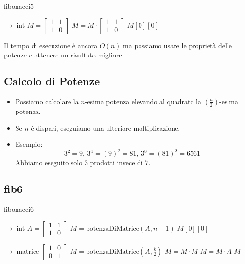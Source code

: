 \documentclass{article}
\begin{document}
\begin{algorithm}
\caption{fibonacci5}
\begin{algorithmic}[1]
 $\rightarrow$ int
  \State $M = \begin{bmatrix} 1 & 1 \\ 1 & 0 \end{bmatrix}$
    \State $M = M \cdot \begin{bmatrix} 1 & 1 \\ 1 & 0 \end{bmatrix}$
  \EndFor
  \State \Return $M[0][0]$
\EndFunction
\end{algorithmic}
Il tempo di esecuzione è ancora $O(n)$ ma possiamo usare le proprietà delle potenze e ottenere un risultato migliore.
\end{algorithm}


\subsection{Calcolo di Potenze}
\begin{itemize}
\item Possiamo calcolare la $n$-esima potenza elevando al quadrato la $\left(\frac{n}{2}\right)$-esima potenza.
\item Se $n$ è dispari, eseguiamo una ulteriore moltiplicazione.

\item Esempio:
  \[3^2 = 9,\ 3^4 = (9)^2 = 81,\ 3^8 = (81)^2 = 6561\]
  Abbiamo eseguito solo $3$ prodotti invece di $7$.
\end{itemize}

\subsection{fib6}
\begin{algorithm}
\caption{fibonacci6}
\begin{algorithmic}[1]
 $\rightarrow$ int
  \State $A = \begin{bmatrix} 1 & 1 \\ 1 & 0 \end{bmatrix}$
  \State $M = \text{potenzaDiMatrice}(A, n-1)$
  \State \Return $M[0][0]$
\EndFunction

 $\rightarrow$ matrice
    \State \Return $\begin{bmatrix} 1 & 0 \\ 0 & 1 \end{bmatrix}$
  \Else
    \State $M = \text{potenzaDiMatrice}(A, \frac{k}{2})$
    \State $M = M \cdot M$
  \EndIf
      \State $M = M \cdot A$
  \EndIf
  \State \Return $M$
\EndFunction
\end{algorithmic}
\end{algorithm}
\end{document}
